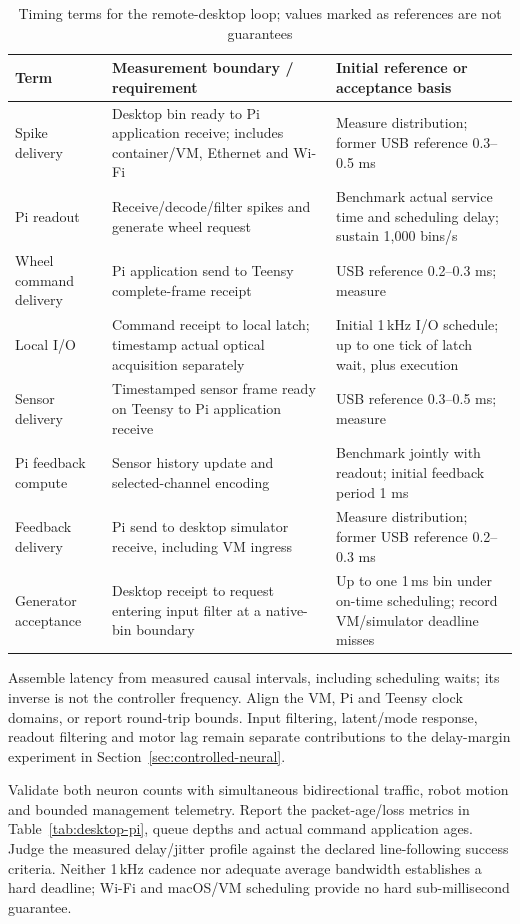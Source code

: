 \begin{table}[H]
\centering\small
\caption{Timing terms for the remote-desktop loop; values marked as references are not guarantees}
\label{tab:timing_budget}
\begin{tabular}{@{}L{3.2cm}L{8.2cm}L{5.1cm}@{}}
\toprule
\textbf{Term} & \textbf{Measurement boundary / requirement} & \textbf{Initial reference or acceptance basis} \\
\midrule
Spike delivery & Desktop bin ready to Pi application receive; includes container/VM, Ethernet and Wi-Fi & Measure distribution; former USB reference 0.3--0.5 ms \\
Pi readout & Receive/decode/filter spikes and generate wheel request & Benchmark actual service time and scheduling delay; sustain 1,000 bins/s \\
Wheel command delivery & Pi application send to Teensy complete-frame receipt & USB reference 0.2--0.3 ms; measure \\
Local I/O & Command receipt to local latch; timestamp actual optical acquisition separately & Initial 1\,kHz I/O schedule; up to one tick of latch wait, plus execution \\
Sensor delivery & Timestamped sensor frame ready on Teensy to Pi application receive & USB reference 0.3--0.5 ms; measure \\
Pi feedback compute & Sensor history update and selected-channel encoding & Benchmark jointly with readout; initial feedback period 1 ms \\
Feedback delivery & Pi send to desktop simulator receive, including VM ingress & Measure distribution; former USB reference 0.2--0.3 ms \\
Generator acceptance & Desktop receipt to request entering input filter at a native-bin boundary & Up to one 1\,ms bin under on-time scheduling; record VM/simulator deadline misses \\
\bottomrule
\end{tabular}
\end{table}

Assemble latency from measured causal intervals, including scheduling waits; its inverse is not the controller frequency. Align the VM, Pi and Teensy clock domains, or report round-trip bounds. Input filtering, latent/mode response, readout filtering and motor lag remain separate contributions to the delay-margin experiment in Section~\ref{sec:controlled-neural}.

Validate both neuron counts with simultaneous bidirectional traffic, robot motion and bounded management telemetry. Report the packet-age/loss metrics in Table~\ref{tab:desktop-pi}, queue depths and actual command application ages. Judge the measured delay/jitter profile against the declared line-following success criteria. Neither 1\,kHz cadence nor adequate average bandwidth establishes a hard deadline; Wi-Fi and macOS/VM scheduling provide no hard sub-millisecond guarantee.

